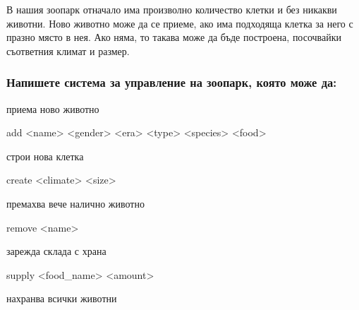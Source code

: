 В нашия зоопарк отначало има произволно количество клетки и без никакви животни. Ново животно може да се приеме, ако има подходяща клетка за него с празно място в нея. Ако няма, то такава може да бъде построена, посочвайки съответния климат и размер.

\subsubsection*{Напишете система за управление на зоопарк, която може да\+:}


\begin{DoxyItemize}
\item приема ново животно
\end{DoxyItemize}


\begin{DoxyCode}
add <name> <gender> <era> <type> <species> <food>
\end{DoxyCode}



\begin{DoxyItemize}
\item строи нова клетка
\end{DoxyItemize}


\begin{DoxyCode}
create <climate> <size>
\end{DoxyCode}



\begin{DoxyItemize}
\item премахва вече налично животно
\end{DoxyItemize}


\begin{DoxyCode}
remove <name>
\end{DoxyCode}



\begin{DoxyItemize}
\item зарежда склада с храна
\end{DoxyItemize}


\begin{DoxyCode}
supply <food\_name> <amount>
\end{DoxyCode}



\begin{DoxyItemize}
\item нахранва всички животни
\end{DoxyItemize}


